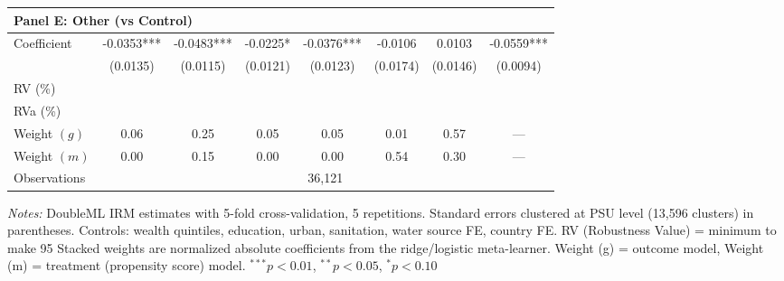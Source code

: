 \begin{table}[htbp]
\begin{tabular}{lccccccc}
\multicolumn{8}{l}{\textbf{Panel E: Other (vs Control)}} \\
\midrule
Coefficient & -0.0353*** & -0.0483*** & -0.0225* & -0.0376*** & -0.0106 & 0.0103 & -0.0559*** \\
 & (0.0135) & (0.0115) & (0.0121) & (0.0123) & (0.0174) & (0.0146) & (0.0094) \\
RV (\%) \\
RVa (\%) \\
Weight $(g)$ & 0.06 & 0.25 & 0.05 & 0.05 & 0.01 & 0.57 & — \\
Weight $(m)$ & 0.00 & 0.15 & 0.00 & 0.00 & 0.54 & 0.30 & — \\

\midrule
Observations & \multicolumn{7}{c}{36,121} \\
\bottomrule
\end{tabular}
\begin{minipage}{\textwidth}
\footnotesize
\textit{Notes:} DoubleML IRM estimates with 5-fold cross-validation, 5 repetitions. 
Standard errors clustered at PSU level (13,596 clusters) in parentheses. 
Controls: wealth quintiles, education, urban, sanitation, water source FE, country FE. 
RV (Robustness Value) = minimum %
to make 95%
Stacked weights are normalized absolute coefficients from the ridge/logistic meta-learner. 
Weight (g) = outcome model, Weight (m) = treatment (propensity score) model. 
$^{***}p<0.01$, $^{**}p<0.05$, $^{*}p<0.10$
\end{minipage}
\end{table}